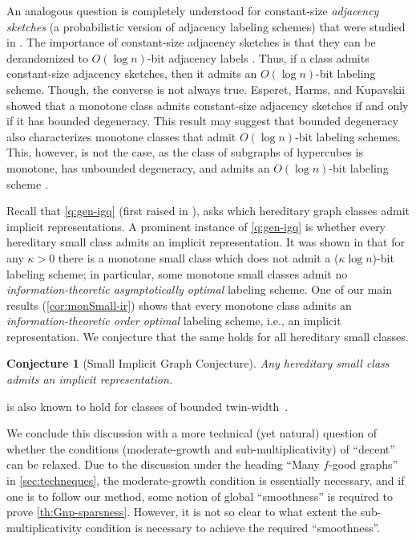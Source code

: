 \documentclass[letterpaper,11pt]{article}
\newcommand{\Slin}{moderate-growth\xspace}
\newcommand{\Smul}{sub-multiplicativity\xspace}
\newtheorem{conjecture}[theorem]{Conjecture}
\theoremstyle{definition}
\theoremstyle{remark}
\begin{document}
	\noindent
	An analogous question is completely understood for constant-size \emph{adjacency sketches} (a probabilistic version of adjacency labeling schemes) that were studied in \cite{FK09,Harms20,HWZ22}. The importance of constant-size adjacency sketches is that they can be derandomized to $O(\log n)$-bit adjacency labels \cite{Harms20,HWZ22}.
	Thus, if a class admits constant-size adjacency sketches, then
	it admits an $O(\log n)$-bit labeling scheme. Though, the converse is not always true. Esperet, Harms, and Kupavskii showed \cite{EHK22} that a monotone class admits constant-size adjacency sketches if and only if it has bounded degeneracy.
	This result may suggest that bounded degeneracy also characterizes monotone classes that admit $O(\log n)$-bit labeling schemes. This, however, is not the case, as the class of subgraphs of hypercubes is monotone, has unbounded degeneracy, and admits an $O(\log n)$-bit labeling scheme \cite{EHZ23}.
	
Recall that \cref{q:gen-igq} (first raised in \cite{Spinrad03}), asks which hereditary graph classes admit implicit representations.
	A prominent instance of \cref{q:gen-igq} is whether every hereditary small class admits an implicit representation. It was shown in \cite{BDSZZ23} that for any $\kappa>0$ there is a monotone small class which does not admit a ($\kappa \log n$)-bit labeling scheme; in particular, some monotone small classes admit no \emph{information-theoretic asymptotically optimal} labeling scheme. One of our main results (\cref{cor:monSmall-ir}) shows that every monotone class admits an \emph{information-theoretic order optimal} labeling scheme, i.e., an implicit representation. We conjecture that the same holds for all hereditary small classes.
	\begin{conjecture}[Small Implicit Graph Conjecture]\label{conj:sigc}
		Any hereditary small class admits an implicit representation. 
	\end{conjecture}
 is also known to hold for classes of bounded twin-width~\cite{BGK22}.
        

 We conclude this discussion with a more technical (yet natural) question of whether the conditions (\Slin and \Smul) of ``decent'' can be relaxed. Due to the discussion under the heading ``Many $f$-good graphs'' in \cref{sec:techneques}, the \Slin condition is essentially necessary, and  if one is to follow our method, some notion of global ``smoothness'' is required to prove \cref{th:Gnp-sparsness}.	
 	However, it is not so clear to what extent the \Smul condition is necessary to achieve the required ``smoothness''.
 	
\end{document}
